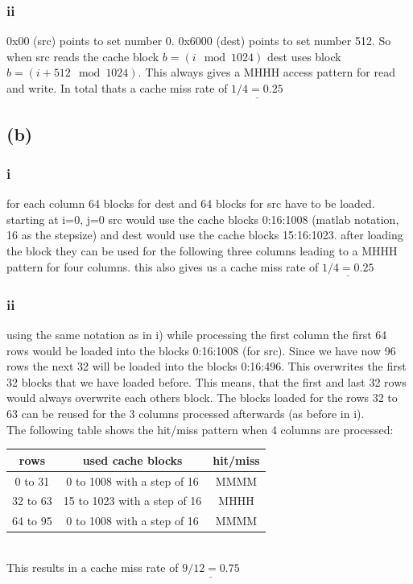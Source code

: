 \documentclass[10pt,a4paper,oneside,notitlepage]{report}
\begin{document}
\subsubsection*{ii}
0x00 (src) points to set number 0. 0x6000 (dest) points to set number 512.
So when src reads the cache block $b=(i \mod 1024)$ dest uses block $b=(i+512 \mod 1024)$. This always gives a MHHH access pattern for read and write. In total thats a cache miss rate of $\underline{1/4=0.25}$

\subsection*{(b)}
\subsubsection*{i}
for each column 64 blocks for dest and 64 blocks for src have to be loaded. starting at i=0, j=0 src would use the cache blocks 0:16:1008 (matlab notation, 16 as the stepsize) and dest would use the cache blocks 15:16:1023. after loading the block they can be used for the following three columns leading to a MHHH pattern for four columns. this also gives us a cache miss rate of $\underline{1/4=0.25}$

\subsubsection*{ii}
using the same notation as in i) while processing the first column the first 64 rows would be loaded into the blocks 0:16:1008 (for src). Since we have now 96 rows the next 32 will be loaded into the blocks 0:16:496. This overwrites the first 32 blocks that we have loaded before.   This means, that the first and last 32 rows would always overwrite each others block. The blocks loaded for the rows 32 to 63 can be reused for the 3 columns processed afterwards (as before in i). \\
The following table shows the hit/miss pattern when 4 columns are processed:\\
\begin{tabular}{|c|c|c|}
\hline 
\rowcolor{gray!30}
\textbf{rows}  & \textbf{used cache blocks} & \textbf{hit/miss} \\ 
\hline 
0 to 31 & 0 to 1008 with a step of 16 & MMMM \\ 
\hline 
32 to 63 & 15 to 1023 with a step of 16 & MHHH \\ 
\hline 
64 to 95 & 0 to 1008 with a step of 16 & MMMM \\ 
\hline 
\end{tabular}  \\
This results in a cache miss rate of $\underline{9/12=0.75}$
\end{document}
